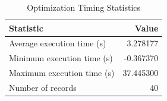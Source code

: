 
\begin{table}[h!]
\centering
\begin{tabular}{l r}
\hline
Statistic & Value \\
\hline
Average execution time (s) & 3.278177 \\
Minimum execution time (s) & -0.367370 \\
Maximum execution time (s) & 37.445300 \\
Number of records & 40 \\
\hline
\end{tabular}
\caption{Optimization Timing Statistics}
\end{table}
